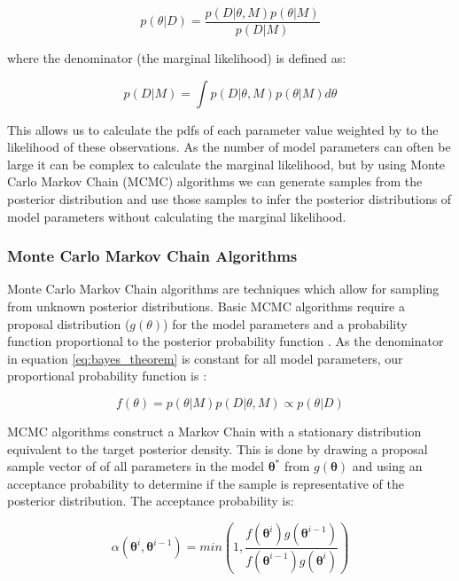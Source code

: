 \documentclass[ %
                    author={Tom Jager},
                supervisor={Dr. Daniel Schien},
                    degree={MEng},
                     title={A Bayesian Inference Engine for Calibrating Uncertainty over UMIS Structured MFA Systems},
                  subtitle={},
                      type={research},
                      year={2019} ]{dissertation}
\begin{document}
\begin{equation}
    \label{eq:bayes_theorem}
    p(\theta | D) = \frac{p(D | \theta, M)p(\theta|M)}{p(D | M)}
\end{equation}

where the denominator (the marginal likelihood) is defined as:

\begin{equation}
    \label{eq:marginal_likelihood}
    p(D| M) = \int{}{}p(D|\theta, M) p(\theta| M)d\theta 
\end{equation}

This allows us to calculate the pdfs of each parameter value weighted by to the likelihood of these observations. As the number of model parameters can often be large it can be complex to calculate the marginal likelihood, but by using Monte Carlo Markov Chain (MCMC) algorithms we can generate samples from the posterior distribution and use those samples to infer the posterior distributions of model parameters without calculating the marginal likelihood.

\subsubsection{Monte Carlo Markov Chain Algorithms}
Monte Carlo Markov Chain algorithms are techniques which allow for sampling from unknown posterior distributions. Basic MCMC algorithms require a proposal distribution ($g(\theta)$) for the model parameters and a probability function proportional to the posterior probability function \cite{green2015bayesian}. As the denominator in equation \ref{eq:bayes_theorem} is constant for all model parameters, our proportional probability function is \cite{lupton2018incremental}:

\begin{equation}
    \label{eq:proportional_dist}
    f(\theta) =  p(\theta|M) p(D | \theta, M) \propto p(\theta | D)
\end{equation}

 MCMC algorithms construct a Markov Chain with a stationary distribution equivalent to the target posterior density. This is done by drawing a proposal sample vector of of all parameters in the model $\bm{\theta}^*$ from $g(\bm{\theta})$ and using an acceptance probability to determine if the sample is representative of the posterior distribution. The acceptance probability is:

\begin{equation}
    \alpha(\bm{\theta}^i, \bm{\theta}^{i-1}) = min (1, \frac{f(\bm{\theta}^i)g(\bm{\theta}^{i-1})}{f(\bm{\theta}^{i-1})g(\bm{\theta}^{i})})
\end{equation}
\end{document}
